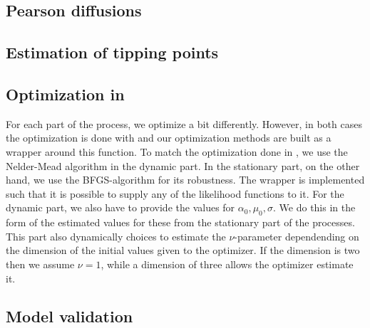 \subsection{Pearson diffusions}
\subsection{Estimation of tipping points}

\subsection{Optimization in }
For each part of the process, we optimize a bit differently. However, in both cases the optimization is done with  \cite{Rlang} and our optimization methods are built as a wrapper around this function. To match the optimization done in \cite{Ditlevsen2023}, we use the Nelder-Mead algorithm in the dynamic part. In the stationary part, on the other hand, we use the BFGS-algorithm for its robustness. The wrapper is implemented such that it is possible to supply any of the likelihood functions to it. For the dynamic part, we also have to provide the values for $\alpha_0, \mu_0, \sigma$. We do this in the form of the estimated values for these from the stationary part of the processes. This part also dynamically choices to estimate the $\nu$-parameter dependending on the dimension of the initial values given to the optimizer. If the dimension is two then we assume $\nu = 1$, while a dimension of three allows the optimizer estimate it.
\subsection{Model validation}